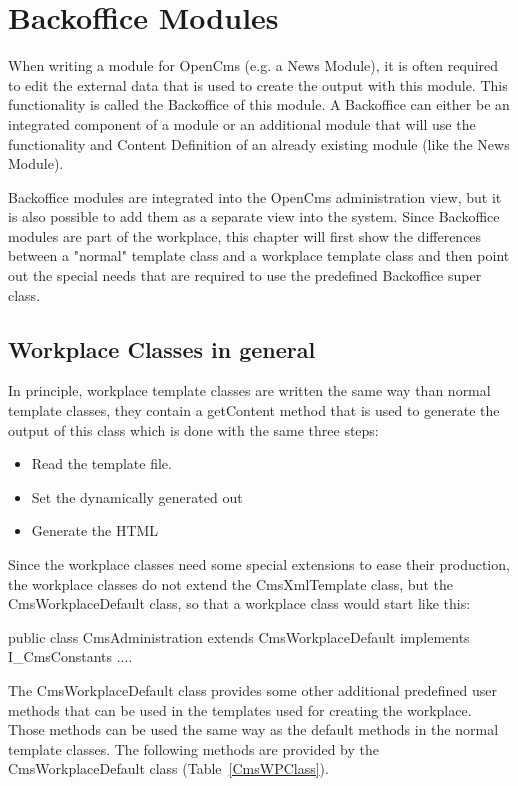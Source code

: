 \chapter {Backoffice Modules}
\label{Backoffice Modules}
When writing a module for OpenCms (e.g. a News Module), it is often
required to edit the external data that is used to create the output
with this module. This functionality is called the Backoffice of this
module. A Backoffice can either be an integrated component of a module
or an additional module that will use the functionality and Content
Definition of an already existing module (like the News Module).

Backoffice modules are integrated into the OpenCms administration view,
but it is also possible to add them as a separate view into the system.
Since Backoffice modules are part of the workplace, this chapter will
first show the differences between a {\class "normal"} template class and a
workplace template class and then point out the special needs that are
required to use the predefined Backoffice super class.

\section {Workplace Classes in general}
In principle, workplace template classes are written the same way than
normal template classes, they contain a getContent method that is used
to generate the output of this class which is done with the same three
steps:
\begin{itemize}
\item Read the template file.
\item Set the dynamically generated out
\item Generate the HTML
\end{itemize}

Since the workplace classes need some special extensions to ease their
production, the workplace classes do not extend the CmsXmlTemplate
class, but the CmsWorkplaceDefault class, so that a workplace class
would start like this:
\begin{java}
public class CmsAdministration extends CmsWorkplaceDefault implements
I\_CmsConstants {....}
\end{java}

The {\class CmsWorkplaceDefault} class provides some other additional predefined
user methods that can be used in the templates used for creating the
workplace. Those methods can be used the same way as the default methods
in the normal template classes. The following methods are provided by
the {\class CmsWorkplaceDefault} class (Table~\ref{CmsWPClass}).


